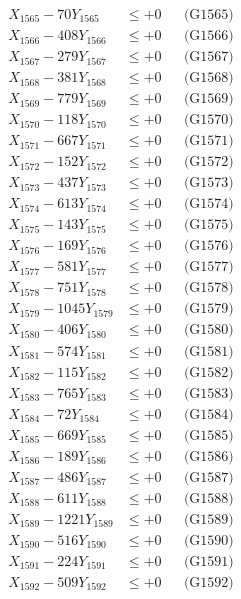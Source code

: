 \documentclass[a4paper,10pt]{article}
\begin{document}
{\begin{align}
X_{1565} - 70Y_{1565} &\leq +0 && \text{(G1565)} \\
X_{1566} - 408Y_{1566} &\leq +0 && \text{(G1566)} \\
X_{1567} - 279Y_{1567} &\leq +0 && \text{(G1567)} \\
X_{1568} - 381Y_{1568} &\leq +0 && \text{(G1568)} \\
X_{1569} - 779Y_{1569} &\leq +0 && \text{(G1569)} \\
X_{1570} - 118Y_{1570} &\leq +0 && \text{(G1570)} \\
\allowbreak
X_{1571} - 667Y_{1571} &\leq +0 && \text{(G1571)} \\
X_{1572} - 152Y_{1572} &\leq +0 && \text{(G1572)} \\
X_{1573} - 437Y_{1573} &\leq +0 && \text{(G1573)} \\
X_{1574} - 613Y_{1574} &\leq +0 && \text{(G1574)} \\
X_{1575} - 143Y_{1575} &\leq +0 && \text{(G1575)} \\
X_{1576} - 169Y_{1576} &\leq +0 && \text{(G1576)} \\
X_{1577} - 581Y_{1577} &\leq +0 && \text{(G1577)} \\
X_{1578} - 751Y_{1578} &\leq +0 && \text{(G1578)} \\
X_{1579} - 1045Y_{1579} &\leq +0 && \text{(G1579)} \\
X_{1580} - 406Y_{1580} &\leq +0 && \text{(G1580)} \\
\allowbreak
X_{1581} - 574Y_{1581} &\leq +0 && \text{(G1581)} \\
X_{1582} - 115Y_{1582} &\leq +0 && \text{(G1582)} \\
X_{1583} - 765Y_{1583} &\leq +0 && \text{(G1583)} \\
X_{1584} - 72Y_{1584} &\leq +0 && \text{(G1584)} \\
X_{1585} - 669Y_{1585} &\leq +0 && \text{(G1585)} \\
X_{1586} - 189Y_{1586} &\leq +0 && \text{(G1586)} \\
X_{1587} - 486Y_{1587} &\leq +0 && \text{(G1587)} \\
X_{1588} - 611Y_{1588} &\leq +0 && \text{(G1588)} \\
X_{1589} - 1221Y_{1589} &\leq +0 && \text{(G1589)} \\
X_{1590} - 516Y_{1590} &\leq +0 && \text{(G1590)} \\
\allowbreak
X_{1591} - 224Y_{1591} &\leq +0 && \text{(G1591)} \\
X_{1592} - 509Y_{1592} &\leq +0 && \text{(G1592)} \\

\end{align}}
\end{document}
